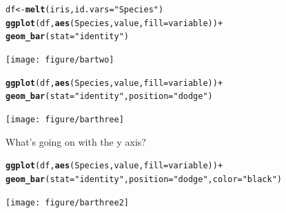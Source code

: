 \documentclass{beamer}\usepackage[]{graphicx}\usepackage[]{color}
\makeatletter
\newcommand{\hlstr}[1]{\textcolor[rgb]{0.192,0.494,0.8}{#1}}%
\newcommand{\hlkwd}[1]{\textcolor[rgb]{0.737,0.353,0.396}{\textbf{#1}}}%
\newenvironment{kframe}{%
 \def\at@end@of@kframe{}%
 \ifinner\ifhmode%
  \def\at@end@of@kframe{\end{minipage}}%
  \begin{minipage}{\columnwidth}%
 \fi\fi%
 \def\FrameCommand##1{\hskip\@totalleftmargin \hskip-\fboxsep
 \colorbox{shadecolor}{##1}\hskip-\fboxsep
     \hskip-\linewidth \hskip-\@totalleftmargin \hskip\columnwidth}%
 \MakeFramed {\advance\hsize-\width
   \@totalleftmargin\z@ \linewidth\hsize
   \@setminipage}}%
 {\par\unskip\endMakeFramed%
 \at@end@of@kframe}
\newenvironment{knitrout}{}{} %
\makeatother
\begin{document}
\begin{frame}[fragile]
\begin{knitrout}\footnotesize
{}\color{fgcolor}\begin{kframe}
\begin{alltt}
df  <- \hlkwd{melt}(iris, id.vars = \hlstr{"Species"})
\hlkwd{ggplot}(df, \hlkwd{aes}(Species, value, fill = variable)) +
\hlkwd{geom_bar}(stat = \hlstr{"identity"})
\end{alltt}
\end{kframe}

{\centering \texttt{[image: figure/bartwo]} 

}



\end{knitrout}

\end{frame}


\begin{frame}[fragile]
\begin{knitrout}\footnotesize
{}\color{fgcolor}\begin{kframe}
\begin{alltt}
\hlkwd{ggplot}(df, \hlkwd{aes}(Species, value, fill = variable)) +
\hlkwd{geom_bar}(stat = \hlstr{"identity"}, position = \hlstr{"dodge"})
\end{alltt}
\end{kframe}

{\centering \texttt{[image: figure/barthree]} 

}



\end{knitrout}

What's going on with the y axis?
\end{frame}


\begin{frame}[fragile]
\begin{knitrout}\footnotesize
{}\color{fgcolor}\begin{kframe}
\begin{alltt}
\hlkwd{ggplot}(df, \hlkwd{aes}(Species, value, fill = variable)) + 
\hlkwd{geom_bar}(stat = \hlstr{"identity"}, position=\hlstr{"dodge"}, color=\hlstr{"black"})
\end{alltt}
\end{kframe}

{\centering \texttt{[image: figure/barthree2]} 

}



\end{knitrout}

\end{frame}
\end{document}
